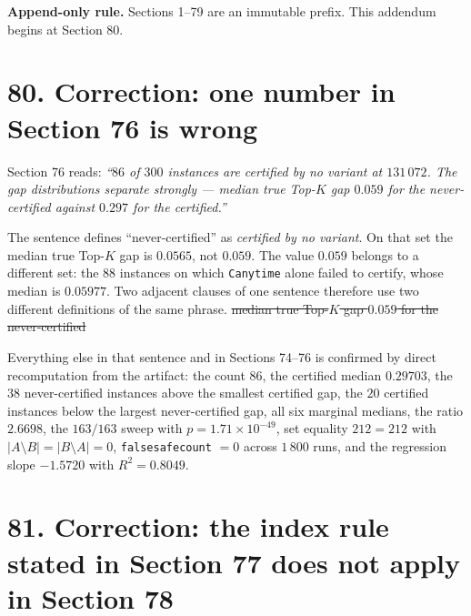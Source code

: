 \documentclass[9pt,twocolumn]{article}
\newcommand{\oldclaim}[1]{\sout{#1}}
\renewcommand{\_}{\CIGunderscore\allowbreak}
\begin{document}
\sloppy
{}

\textbf{Append-only rule.} Sections 1--79 are an immutable prefix. This addendum begins at Section 80.

\section*{80. Correction: one number in Section 76 is wrong}

Section 76 reads: \emph{``$86$ of $300$ instances are certified by no variant at $131\,072$. The gap distributions separate strongly --- median true Top-$K$ gap $0.059$ for the never-certified against $0.297$ for the certified.''}

The sentence defines ``never-certified'' as \emph{certified by no variant}. On that set the median true Top-$K$ gap is $\mathbf{0.0565}$, not $0.059$. The value $0.059$ belongs to a different set: the $88$ instances on which \texttt{C\_anytime} alone failed to certify, whose median is $0.05977$. Two adjacent clauses of one sentence therefore use two different definitions of the same phrase. \oldclaim{median true Top-$K$ gap $0.059$ for the never-certified}

Everything else in that sentence and in Sections 74--76 is confirmed by direct recomputation from the artifact: the count $86$, the certified median $0.29703$, the $38$ never-certified instances above the smallest certified gap, the $20$ certified instances below the largest never-certified gap, all six marginal medians, the ratio $2.6698$, the $163/163$ sweep with $p = 1.71\times10^{-49}$, set equality $212=212$ with $|A\setminus B|=|B\setminus A|=0$, \texttt{false\_safe\_count} $=0$ across $1\,800$ runs, and the regression slope $-1.5720$ with $R^2 = 0.8049$.

\section*{81. Correction: the index rule stated in Section 77 does not apply in Section 78}
\end{document}
